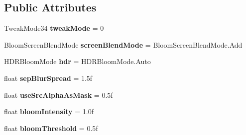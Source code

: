 \subsection*{Public Attributes}
\begin{DoxyCompactItemize}
\item 
Tweak\+Mode34 {\bfseries tweak\+Mode} = 0\hypertarget{class_unity_standard_assets_1_1_image_effects_1_1_bloom_and_flares_a74a32b2fcaeea91d0554b4e11b96c39b}{}\label{class_unity_standard_assets_1_1_image_effects_1_1_bloom_and_flares_a74a32b2fcaeea91d0554b4e11b96c39b}

\item 
Bloom\+Screen\+Blend\+Mode {\bfseries screen\+Blend\+Mode} = Bloom\+Screen\+Blend\+Mode.\+Add\hypertarget{class_unity_standard_assets_1_1_image_effects_1_1_bloom_and_flares_a612b26ac43c7f909d4332c0ea54f2e52}{}\label{class_unity_standard_assets_1_1_image_effects_1_1_bloom_and_flares_a612b26ac43c7f909d4332c0ea54f2e52}

\item 
H\+D\+R\+Bloom\+Mode {\bfseries hdr} = H\+D\+R\+Bloom\+Mode.\+Auto\hypertarget{class_unity_standard_assets_1_1_image_effects_1_1_bloom_and_flares_ac3fcdb8cd742b51fdc9f9f0cc2d8e9f7}{}\label{class_unity_standard_assets_1_1_image_effects_1_1_bloom_and_flares_ac3fcdb8cd742b51fdc9f9f0cc2d8e9f7}

\item 
float {\bfseries sep\+Blur\+Spread} = 1.\+5f\hypertarget{class_unity_standard_assets_1_1_image_effects_1_1_bloom_and_flares_a1fee665bf1fdd9e1ec47711ca90624a0}{}\label{class_unity_standard_assets_1_1_image_effects_1_1_bloom_and_flares_a1fee665bf1fdd9e1ec47711ca90624a0}

\item 
float {\bfseries use\+Src\+Alpha\+As\+Mask} = 0.\+5f\hypertarget{class_unity_standard_assets_1_1_image_effects_1_1_bloom_and_flares_a8df7f61e10eaaa321399dc74c76b3b3a}{}\label{class_unity_standard_assets_1_1_image_effects_1_1_bloom_and_flares_a8df7f61e10eaaa321399dc74c76b3b3a}

\item 
float {\bfseries bloom\+Intensity} = 1.\+0f\hypertarget{class_unity_standard_assets_1_1_image_effects_1_1_bloom_and_flares_a772aaf2be190cdfde6c105253750fdda}{}\label{class_unity_standard_assets_1_1_image_effects_1_1_bloom_and_flares_a772aaf2be190cdfde6c105253750fdda}

\item 
float {\bfseries bloom\+Threshold} = 0.\+5f\hypertarget{class_unity_standard_assets_1_1_image_effects_1_1_bloom_and_flares_a4d264106d882ddbd47081646bbd77e20}{}\label{class_unity_standard_assets_1_1_image_effects_1_1_bloom_and_flares_a4d264106d882ddbd47081646bbd77e20}


\end{DoxyCompactItemize}
